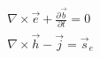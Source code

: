 \begin{equation}
\begin{split}
\nabla \times \vec{e} + \frac{\partial \vec{b}}{\partial t} = 0 \\
\nabla \times \vec{h} - \vec{j} = \vec{s}_e
\end{split}
\label{eq:MaxwellTime}
\end{equation}
